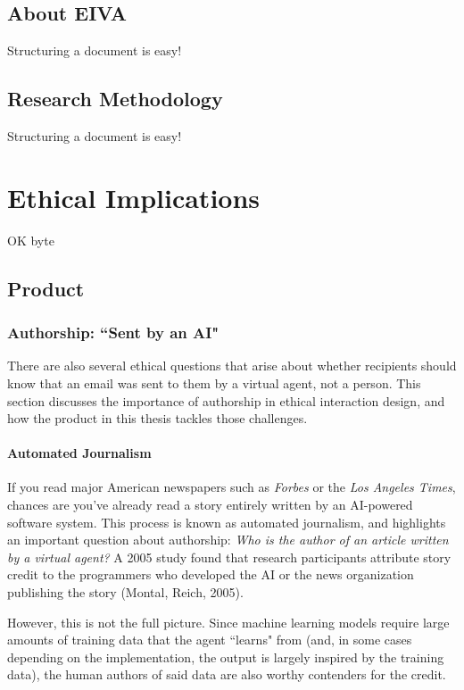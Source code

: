\documentclass{article}
\begin{document}
\subsection{About EIVA}

Structuring a document is easy!

\subsection{Research Methodology}

Structuring a document is easy!

\section{Ethical Implications}

OK byte

\subsection{Product}

\subsubsection{Authorship: ``Sent by an AI"}

There are also several ethical questions that arise about whether recipients should know that an email was sent to them by a virtual agent, not a person. This section discusses the importance of authorship in ethical interaction design, and how the product in this thesis tackles those challenges.

\paragraph{Automated Journalism}


If you read major American newspapers such as \emph{Forbes} or the \emph{Los Angeles Times}, chances are you've already read a story entirely written by an AI-powered software system. This process is known as automated journalism, and highlights an important question about authorship: \emph{Who is the author of an article written by a virtual agent?} A 2005 study found that research participants attribute story credit to the programmers who developed the AI or the news organization publishing the story (Montal, Reich, 2005). 

However, this is not the full picture. Since machine learning models require large amounts of training data that the agent ``learns" from (and, in some cases depending on the implementation, the output is largely inspired by the training data), the human authors of said data are also worthy contenders for the credit.
\end{document}
